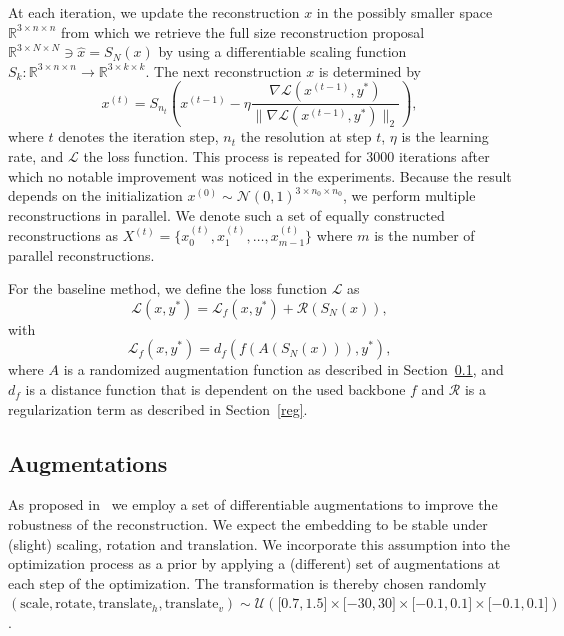 \documentclass[10pt,twocolumn]{article}
\begin{document}
At each iteration, we update the reconstruction $x$ in the possibly smaller space $\mathbb{R}^{3\times n \times n}$ from which we retrieve the full size reconstruction proposal $\mathbb{R}^{3\times N \times N}\ni\hat{x} = S_N(x)$ by using a differentiable scaling function $S_k:\mathbb{R}^{3\times n \times n}\rightarrow\mathbb{R}^{3\times k \times k}$.
The next reconstruction $x$ is determined by
\begin{equation}\label{eq:update_rule}
x^{(t)} = S_{n_t}\left(x^{(t-1)} - \eta \dfrac{\nabla \mathcal{L}(x^{(t-1)}, y^*)}{\|\nabla \mathcal{L}(x^{(t-1)}, y^*)\|_2}\right),
\end{equation}
where $t$ denotes the iteration step, $n_t$ the resolution at step $t$, $\eta$ is the learning rate, and $\mathcal{L}$ the loss function.
This process is repeated for 3000 iterations after which no notable improvement was noticed in the experiments.
Because the result depends on the initialization $x^{(0)}\sim \mathcal{N}(0, 1)^{3\times n_0 \times n_0}$, we perform multiple reconstructions in parallel.
We denote such a set of equally constructed reconstructions as $X^{(t)} = \{x^{(t)}_0, x^{(t)}_1, \dots, x^{(t)}_{m-1}\}$ where $m$ is the number of parallel reconstructions.

For the baseline method, we define the loss function $\mathcal{L}$ as
\begin{equation}\label{eq:loss_function_base}
\mathcal{L}(x, y^*) = \mathcal{L}_{f}(x, y^*) + \mathcal{R}(S_N(x)),
\end{equation}
with
\begin{equation}\label{eq:loss_function_f}
    \mathcal{L}_f(x, y^*) = d_{f}(f(A(S_N(x))), y^*),
\end{equation}
where $A$ is a randomized augmentation function as described in Section~\ref{augs}, and $d_f$ is a distance function that is dependent on the used backbone $f$ and $\mathcal{R}$ is a regularization term as described in Section~\ref{reg}.

\subsection{Augmentations}\label{augs}
As proposed in~\cite{ghiasiPlugInInversionModelAgnostic2021} we employ a set of differentiable augmentations to improve the robustness of the reconstruction.
We expect the embedding to be stable under (slight) scaling, rotation and translation.
We incorporate this assumption into the optimization process as a prior by applying a (different) set of augmentations at each step of the optimization.
The transformation is thereby chosen randomly $(\text{scale}, \text{rotate}, \text{translate}_h, \text{translate}_v) \sim \mathcal{U}(\lbrack 0.7, 1.5\rbrack\times \lbrack -30, 30\rbrack \times \lbrack -0.1, 0.1\rbrack \times \lbrack -0.1, 0.1\rbrack)$.
\end{document}
